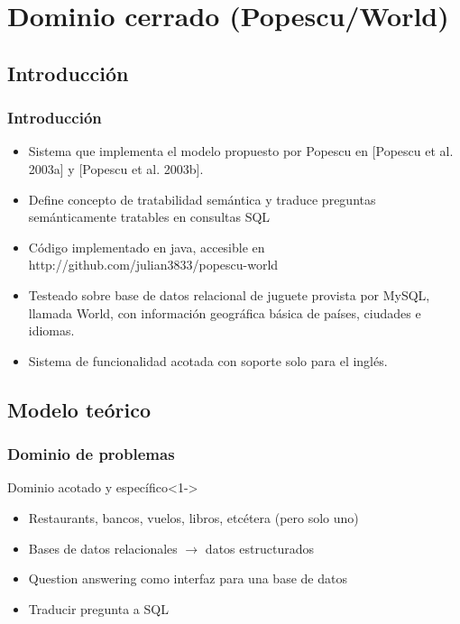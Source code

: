 \fontsize{9.5pt}{7.2}\selectfont
\section{Dominio cerrado (Popescu/World)}
\subsection{Introducción}
\begin{frame}
\frametitle{Introducción}
\begin{itemize}
  \item Sistema que implementa el modelo propuesto por Popescu en [Popescu et al. 2003a] y  [Popescu et al. 2003b].
  \item Define concepto de tratabilidad semántica y traduce preguntas semánticamente tratables en consultas SQL
  \item Código implementado en java, accesible en http://github.com/julian3833/popescu-world
  \item Testeado sobre base de datos relacional de juguete provista por MySQL, llamada World, con información geográfica básica de países, ciudades e idiomas.
  \item Sistema de funcionalidad acotada con soporte solo para el inglés.
\end{itemize}
\end{frame}

\subsection{Modelo teórico}

\begin{frame}
  \frametitle{Dominio de problemas}
   \begin{block}{Dominio acotado y específico}<1->
      \begin{itemize}
          \item Restaurants, bancos, vuelos, libros, etcétera (pero solo uno)
          \item Bases de datos relacionales $\rightarrow$ datos estructurados
          \item Question answering como interfaz para una base de datos
          \item Traducir pregunta a SQL
      \end{itemize}
    \end{block}
\end{frame}

